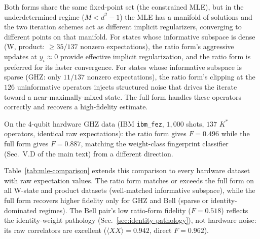 \documentclass[twocolumn,prx,aps,superscriptaddress,longbibliography]{revtex4-2}
\begin{document}
Both forms share the same fixed-point set (the constrained MLE),
but in the underdetermined regime ($M < d^2 - 1$) the MLE has
a manifold of solutions and the two iteration schemes act as
different implicit regularizers, converging to different points
on that manifold.
For states whose informative subspace is dense
(W, product: $\ge 35/137$ nonzero expectations), the ratio form's
aggressive updates at $y_i \approx 0$ provide effective
implicit regularization, and the ratio form is preferred for
its faster convergence.
For states whose informative subspace is sparse
(GHZ: only $11/137$ nonzero expectations), the ratio form's
clipping at the $126$ uninformative operators injects structured
noise that drives the iterate toward a near-maximally-mixed state.
The full form handles these operators correctly and recovers
a high-fidelity estimate.

On the 4-qubit hardware GHZ data (IBM \texttt{ibm\_fez},
$1{,}000$ shots, $137$ $K^*$ operators, identical raw expectations):
the ratio form gives $F = 0.496$ while the full form gives
$F = 0.887$, matching the weight-class fingerprint classifier
(Sec.~V.D of the main text) from a different direction.

Table~\ref{tab:mle-comparison} extends this comparison to every
hardware dataset with raw expectation values.
The ratio form matches or exceeds the full form on all W-state and
product datasets (well-matched informative subspace),
while the full form recovers higher fidelity only for GHZ and
Bell (sparse or identity-dominated regimes).
The Bell pair's low ratio-form fidelity ($F = 0.518$) reflects the
identity-weight pathology (Sec.~\ref{sec:identity-pathology}), not
hardware noise: its raw correlators are excellent
($\langle XX\rangle = 0.942$, direct $F = 0.962$).
\end{document}

